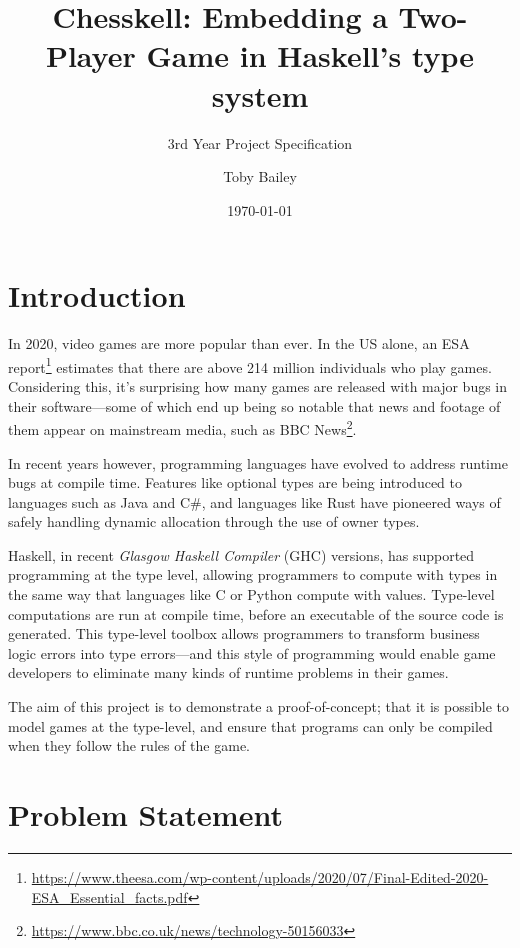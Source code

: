 \documentclass[12pt, a4paper]{scrartcl}
\title{Chesskell: Embedding a Two-Player Game in Haskell's type system}
\subtitle{3rd Year Project Specification}
\author{Toby Bailey}
\date{\today}
\begin{document}
\begin{titlepage}
    \maketitle
    \tableofcontents
\end{titlepage}

\section{Introduction}

In 2020, video games are more popular than ever. In the US alone, an ESA report\footnote{\url{https://www.theesa.com/wp-content/uploads/2020/07/Final-Edited-2020-ESA_Essential_facts.pdf}} estimates that there are above 214 million individuals who play games. Considering this, it's surprising how many games are released with major bugs in their software---some of which end up being so notable that news and footage of them appear on mainstream media, such as BBC News\footnote{\url{https://www.bbc.co.uk/news/technology-50156033}}.

In recent years however, programming languages have evolved to address runtime bugs at compile time. Features like optional types are being introduced to languages such as Java and C\#, and languages like Rust have pioneered ways of safely handling dynamic allocation through the use of owner types.


Haskell, in recent \emph{Glasgow Haskell Compiler} (GHC) versions, has supported programming at the type level, allowing programmers to compute with types in the same way that languages like C or Python compute with values. Type-level computations are run at compile time, before an executable of the source code is generated. This type-level toolbox allows programmers to transform business logic errors into type errors---and this style of programming would enable game developers to eliminate many kinds of runtime problems in their games.

The aim of this project is to demonstrate a proof-of-concept; that it is possible to model games at the type-level, and ensure that programs can only be compiled when they follow the rules of the game.

\section{Problem Statement}
\end{document}
